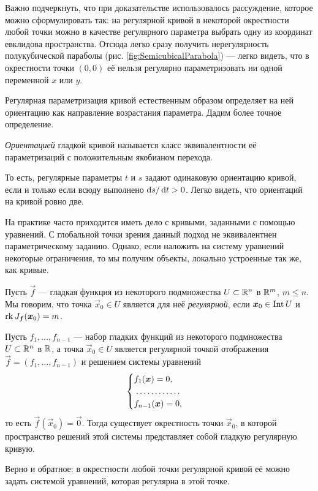 Важно подчеркнуть, что при доказательстве использовалось рассуждение, которое можно сформулировать так: на регулярной кривой в некоторой окрестности любой точки можно в качестве регулярного параметра выбрать одну из координат евклидова пространства. Отсюда легко сразу получить нерегулярность полукубической параболы (рис. \ref{fig:SemicubicalParabola}) --- легко видеть, что в окрестности точки $(0, 0)$ её нельзя регулярно параметризовать ни одной переменной $x$ или $y$.

Регулярная параметризация кривой естественным образом определяет на ней ориентацию как направление возрастания параметра. Дадим более точное определение.

\begin{definition}
	\textit{Ориентацией} гладкой кривой называется класс эквивалентности её параметризаций с положительным якобианом перехода.
\end{definition}

То есть, регулярные параметры $t$ и $s$ задают одинаковую ориентацию кривой, если и только если всюду выполнено $\mathop{}\!\mathrm{d} s / \mathop{}\!\mathrm{d} t > 0$. Легко видеть, что ориентаций на кривой ровно две.

На практике часто приходится иметь дело с кривыми, заданными с помощью уравнений. С глобальной точки зрения данный подход не эквивалентнен параметрическому заданию. Однако, если наложить на систему уравнений некоторые ограничения, то мы получим объекты, локально устроенные так же, как кривые.

\begin{definition}
	Пусть $\vec{f}$ --- гладкая функция из некоторого подмножества $U \subset \mathbb{R}^n$ в $\mathbb{R}^m$, $m \leqslant n$. Мы говорим, что точка $\vec{x}_0 \in U$ является для неё \textit{регулярной}, если $\boldsymbol{x}_0 \in \operatorname{Int} U$ и $\operatorname{rk} J_{\boldsymbol{f}}(\boldsymbol{x}_0) = m$.
\end{definition}

\begin{theorem} \label{theorem:SurfacesToCurve}
	Пусть $f_1, \ldots, f_{n - 1}$ --- набор гладких функций из некоторого подмножества $U \subset \mathbb{R}^n$ в $\mathbb{R}$, а точка $\vec{x}_0 \in U$ является регулярной точкой отображения $\vec{f} = (f_1, \ldots, f_{n - 1})$ и решением системы уравнений
	\[
		\begin{cases}
			f_1(\vec{x}) = 0,\\
			\dotfill\\
			f_{n - 1}(\vec{x}) = 0,
		\end{cases}
	\]
	то есть $\vec{f}(\vec{x}_0) = \vec{0}$. Тогда существует окрестность точки $\vec{x}_0$, в которой пространство решений этой системы представляет собой гладкую регулярную кривую.
	
	Верно и обратное: в окрестности любой точки регулярной кривой её можно задать системой уравнений, которая регулярна в этой точке.
\end{theorem}

